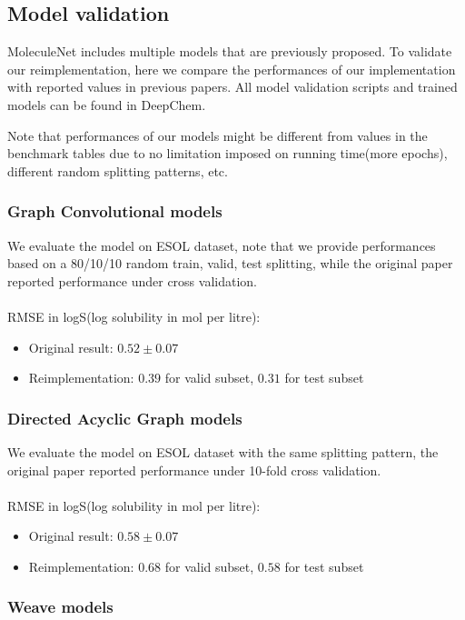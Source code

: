 \subsection{Model validation}
MoleculeNet includes multiple models that are previously proposed. To validate our reimplementation, here we compare the performances of our implementation with reported values in previous papers. All model validation scripts and trained models can be found in DeepChem.

Note that performances of our models might be different from values in the benchmark tables due to no limitation imposed on running time(more epochs), different random splitting patterns, etc.

\subsubsection{Graph Convolutional models}

We evaluate the model on ESOL dataset, note that we provide performances based on a 80/10/10 random train, valid, test splitting, while the original paper reported performance under cross validation.\cite{graphconv_feat}
~\\\\
RMSE in logS(log solubility in mol per litre):
\begin{itemize}
    \item Original result: $0.52\pm0.07$
    \item Reimplementation: $0.39$ for valid subset, $0.31$ for test subset
\end{itemize}

\subsubsection{Directed Acyclic Graph models}

We evaluate the model on ESOL dataset with the same splitting pattern, the original paper reported performance under 10-fold cross validation.\cite{lusci2013deep}
~\\\\
RMSE in logS(log solubility in mol per litre):
\begin{itemize}
    \item Original result: $0.58\pm0.07$
    \item Reimplementation: $0.68$ for valid subset, $0.58$ for test subset
\end{itemize}

\subsubsection{Weave models}

